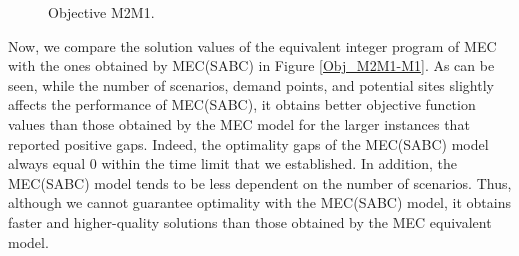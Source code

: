 \begin{figure}[H]
\hspace{0.4cm}%
\vspace{0.4cm}
\caption{Objective M2M1.}
\label{Obj_M2M1}
\end{figure}

Now, we compare the solution values of the equivalent integer program of MEC with the ones obtained by MEC(SABC) in Figure \ref{Obj_M2M1-M1}. As can be seen, while the number of scenarios, demand points, and potential sites slightly affects the performance of MEC(SABC), it obtains better objective function values than those obtained by the MEC model for the larger instances that reported positive gaps. Indeed, the optimality gaps of the MEC(SABC) model always equal 0 within the time limit that we established. In addition, the MEC(SABC) model tends to be less dependent on the number of scenarios. Thus, although we cannot guarantee optimality with the MEC(SABC) model, it obtains faster and higher-quality solutions than those obtained by the MEC equivalent model. 


